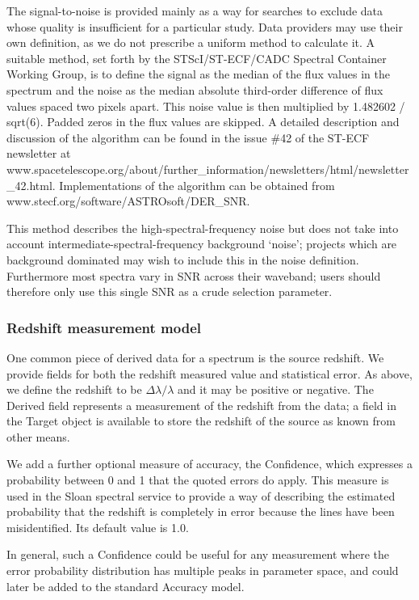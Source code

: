 \documentclass[11pt]{article}
\begin{document}
The signal-to-noise is provided mainly as a way for searches to
exclude data whose quality is insufficient for a particular
study. Data providers may use their own definition, as we do not
prescribe a uniform method to calculate it. A suitable method,
set forth by the STScI/ST-ECF/CADC Spectral Container Working Group, is
to define the signal as the median of the flux values in the spectrum
and the noise as the median absolute third-order difference of flux
values spaced two pixels apart. This noise value is then multiplied by
1.482602 / sqrt(6). Padded zeros in the flux values are skipped. A
detailed description and discussion of the algorithm can be found in the
issue \#42 of the ST-ECF newsletter at
www.spacetelescope.org/about/further\_information/newsletters/html/newsletter\_42.html.
Implementations of the algorithm can be obtained from
www.stecf.org/software/ASTROsoft/DER\_SNR. 

This method describes the high-spectral-frequency noise
but does not take into account intermediate-spectral-frequency 
background `noise'; projects which are background dominated
may wish to include this in the noise definition. Furthermore
most spectra vary in SNR across their waveband; users
should therefore only use this single SNR as a crude selection
parameter.


\subsubsection{Redshift measurement model}  

One common piece of derived data for a spectrum is the source redshift.
We provide fields for both the redshift measured value and statistical error.
As above, we define the redshift to be $\Delta\lambda/\lambda$ and it
may be positive or negative. The Derived field represents a measurement
of the redshift from the data; a field in the Target object is available
to store the redshift of the source as known from other means. 

We add a further optional measure of accuracy, the Confidence, which expresses
a probability between 0 and 1 that the quoted errors do apply. This measure
is used in the Sloan spectral service to provide a way of describing the
estimated probability that the redshift is completely in error because
the lines have been misidentified. Its default value is 1.0.

In general, such a Confidence could be useful for any measurement where
the error probability distribution has multiple peaks in parameter
space, and could later be added to the standard Accuracy model.
\end{document}
